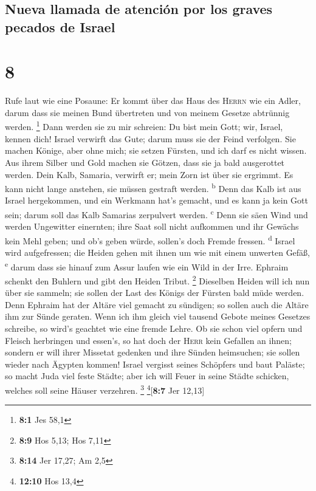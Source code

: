 \hypertarget{nueva-llamada-de-atenciuxf3n-por-los-graves-pecados-de-israel}{%
\subsection{Nueva llamada de atención por los graves pecados de
Israel}\label{nueva-llamada-de-atenciuxf3n-por-los-graves-pecados-de-israel}}

\hypertarget{section-7}{%
\section{8}\label{section-7}}

 Rufe laut wie eine Posaune: Er kommt über das Haus des
\textsc{Herrn} wie ein Adler, darum dass sie meinen Bund übertreten und
von meinem Gesetze abtrünnig werden. \footnote{\textbf{8:1} Jes 58,1}
 Dann werden sie zu mir schreien: Du bist mein Gott; wir,
Israel, kennen dich!  Israel verwirft das Gute; darum muss
sie der Feind verfolgen.  Sie machen Könige, aber ohne
mich; sie setzen Fürsten, und ich darf es nicht wissen. Aus ihrem Silber
und Gold machen sie Götzen, dass sie ja bald ausgerottet werden.
 Dein Kalb, Samaria, verwirft er; mein Zorn ist über sie
ergrimmt. Es kann nicht lange anstehen, sie müssen gestraft werden.
\textsuperscript{b}  Denn das Kalb ist aus Israel
hergekommen, und ein Werkmann hat's gemacht, und es kann ja kein Gott
sein; darum soll das Kalb Samarias zerpulvert werden.
\textsuperscript{c}  Denn sie säen Wind und werden
Ungewitter einernten; ihre Saat soll nicht aufkommen und ihr Gewächs
kein Mehl geben; und ob's geben würde, sollen's doch Fremde fressen.
\textsuperscript{d}  Israel wird aufgefressen; die Heiden
gehen mit ihnen um wie mit einem unwerten Gefäß, \textsuperscript{e}
 darum dass sie hinauf zum Assur laufen wie ein Wild in
der Irre. Ephraim schenkt den Buhlern und gibt den Heiden Tribut.
\footnote{\textbf{8:9} Hos 5,13; Hos 7,11}  Dieselben
Heiden will ich nun über sie sammeln; sie sollen der Last des Königs der
Fürsten bald müde werden.  Denn Ephraim hat der Altäre
viel gemacht zu sündigen; so sollen auch die Altäre ihm zur Sünde
geraten.  Wenn ich ihm gleich viel tausend Gebote meines
Gesetzes schreibe, so wird's geachtet wie eine fremde Lehre.
 Ob sie schon viel opfern und Fleisch herbringen und
essen's, so hat doch der \textsc{Herr} kein Gefallen an ihnen; sondern
er will ihrer Missetat gedenken und ihre Sünden heimsuchen; sie sollen
wieder nach Ägypten kommen!  Israel vergisst seines
Schöpfers und baut Paläste; so macht Juda viel feste Städte; aber ich
will Feuer in seine Städte schicken, welches soll seine Häuser
verzehren. \footnote{\textbf{8:14} Jer 17,27; Am 2,5}
\footnote{\textbf{12:10} Hos 13,4}{[}\textbf{8:7} Jer 12,13{]}


